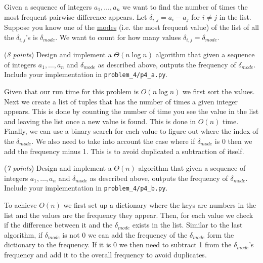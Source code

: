 \documentclass{hw}
\begin{document}
\begin{problem}
    Given a sequence of integers $a_1,\ldots,a_n$ we want to find the number of times the most frequent pairwise difference appears. Let $\delta_{i, j} = a_i - a_j$ for $i \ne j$ in the list. Suppose you know one of the \href{https://en.wikipedia.org/wiki/Mode_(statistics)}{modes} (i.e. the most frequent value) of the list of all the $\delta_{i, j}$'s is $\delta_{mode}$. We want to count for how many values $\delta_{i, j} = \delta_{mode}$. 

    \begin{subproblem}
        (\textit{8 points})
        Design and implement a $\Theta(n \log n)$ algorithm that given a sequence of integers $a_1,\ldots,a_n$ and $\delta_{mode}$ as described above, outputs the frequency of $\delta_{mode}$. Include your implementation in \texttt{problem\_4/p4\_a.py}.
    \end{subproblem}
  
    \begin{solution}
        Given that our run time for this problem is $O(n \log n)$ we first sort the values. Next we create a list of tuples that has the number of times a given integer appears. This is done by counting the number of time you see the value in the list and leaving the list once a new value is found. This is done in $O(n)$ time. Finally, we can use a binary search for each value to figure out where the index of the $\delta_{mode}$. We also need to take into account the case where if $\delta_{mode}$ is 0 then we add the frequency minus 1. This is to avoid duplicated a subtraction of itself.
    \end{solution}
  
    \begin{subproblem}
        (\textit{7 points})
        Design and implement a $\Theta(n)$ algorithm that given a sequence of integers $a_1,\ldots,a_n$ and $\delta_{mode}$ as described above, outputs the frequency of $\delta_{mode}$. Include your implementation in \texttt{problem\_4/p4\_b.py}.
    \end{subproblem}
    
    \begin{solution}
        To achieve $O(n)$ we first set up a dictionary where the keys are numbers in the list and the values are the frequency they appear. Then, for each value we check if the difference between it and the $\delta_{mode}$ exists in the list. Similar to the last algorithm, if $\delta_{mode}$ is not 0 we can add the frequency of the $\delta_{mode}$ form the dictionary to the frequency. If it is 0 we then need to subtract 1 from the $\delta_{mode}$'s frequency and add it to the overall frequency to avoid duplicates.
    \end{solution}
  

\end{problem}
\end{document}

